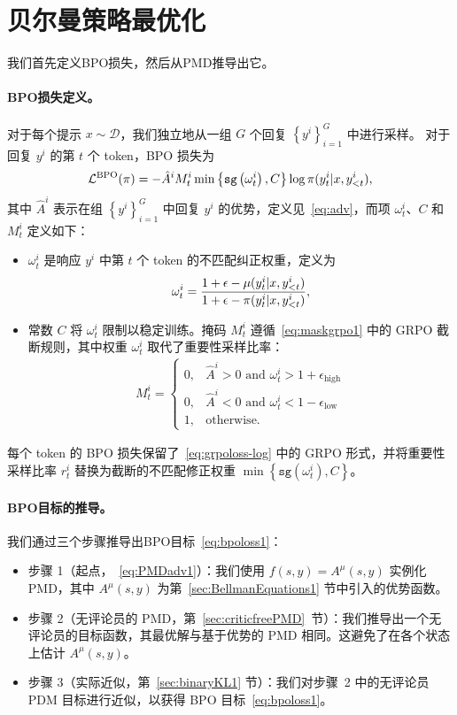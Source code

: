 \documentclass[11pt]{article}
\theoremstyle{definition}
\def\eq#1{\begin{equation*}\begin{split}#1\end{split}\end{equation*}}
\def\eql#1#2{\begin{equation}{#1}\begin{split}#2\end{split}\end{equation}}
\def\pr#1{\left( #1 \right ) }
\def\dr#1{\left\{#1\right\}}
\def\calD{\mathcal{D}}
\def\calL{\mathcal{L}}
\newcommand \eps{\epsilon}
\newcommand\wt{\omega}
\newcommand\adv{\hat{A}}
\newcommand\stopgrad{\texttt{sg}}
\begin{document}
\section{贝尔曼策略最优化}
我们首先定义BPO损失，然后从PMD推导出它。

\paragraph{BPO损失定义。}
对于每个提示 $x\sim\calD$，我们独立地从一组 $G$ 个回复 $\dr{y^i}_{i=1}^G$ 中进行采样。  
对于回复 $y^i$ 的第 $t$ 个 token，BPO 损失为
\eql{\label{eq:bpoloss1}}{
    \calL^{\text{BPO}}(\pi) = - 
    \adv^i M^i_t\min\dr{\texttt{sg}\pr{\wt^i_{t}}, C} \log\pi(y^i_t| x, y^i_{<t}),  
}  
其中 $\adv^i$ 表示在组 $\dr{y^i}_{i=1}^G$ 中回复 $y^i$ 的优势，定义见~\eqref{eq:adv}，而项 $\wt^i_t$、$C$ 和 $M^i_t$ 定义如下：
\begin{itemize}
    \item $\wt^i_t$ 是响应 $y^i$ 中第 $t$ 个 token 的不匹配纠正权重，定义为  
    \eql{\label{eq:wti1}}{
        \wt^i_t = \frac{1 + \eps - \mu(y^i_t|x, y^i_{<t})}{1 + \eps - \pi(y^i_t|x, y^i_{<t})},  
    }

    \item 常数 $C$ 将 $\wt^i_t$ 限制以稳定训练。掩码 $M_t^i$ 遵循~\eqref{eq:maskgrpo1} 中的 GRPO 截断规则，其中权重 $\wt_t^i$ 取代了重要性采样比率： 
    \eq{
        M^i_t = 
        \left\{
        \begin{array}{ll}
            0, & \adv^i > 0 \text{ and } \wt^i_t > 1 + \eps_{\text{high}} \\
            0, & \adv^i < 0 \text{ and } \wt^i_t < 1 - \eps_{\text{low}} \\
            1, & \text{otherwise.}
        \end{array}
        \right.
    }
\end{itemize}
每个 token 的 BPO 损失保留了~\eqref{eq:grpoloss-log} 中的 GRPO 形式，并将重要性采样比率 $r_t^i$ 替换为截断的不匹配修正权重 $\min\dr{\stopgrad\pr{\wt_t^i}, C}$。

\paragraph{BPO目标的推导。} 
我们通过三个步骤推导出BPO目标~\eqref{eq:bpoloss1}：
\begin{itemize}
    \item 步骤 1（起点，~\eqref{eq:PMDadv1}）：我们使用 $f(s, y) = A^{\mu}(s, y)$ 实例化 PMD，其中 $A^{\mu}(s, y)$ 为第~\ref{sec:BellmanEquations1} 节中引入的优势函数。
    \item 步骤 2（无评论员的 PMD，第~\ref{sec:criticfreePMD}~节）：我们推导出一个无评论员的目标函数，其最优解与基于优势的 PMD 相同。这避免了在各个状态上估计 $A^\mu(s,y)$。  
    \item 步骤 3（实际近似，第~\ref{sec:binaryKL1} 节）：我们对步骤~2 中的无评论员 PDM 目标进行近似，以获得 BPO 目标~\eqref{eq:bpoloss1}。  
\end{itemize}
\end{document}
